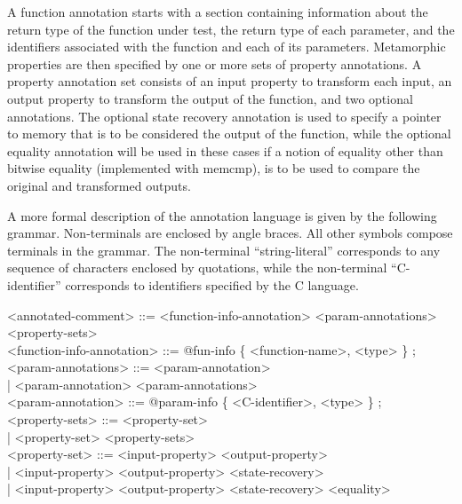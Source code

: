 \documentclass[notitlepage]{article}
\begin{document}
A function annotation starts with a section containing information about the return type of the function under test, the return type of each parameter, and the identifiers associated with the function and each of its parameters. Metamorphic properties are then specified by one or more sets of property annotations. A property annotation set consists of an input property to transform each input, an output property to transform the output of the function, and two optional annotations. The optional state recovery annotation is used to specify a pointer to memory that is to be considered the output of the function, while the optional equality annotation will be used in these cases if a notion of equality other than bitwise equality (implemented with memcmp), is to be used to compare the original and transformed outputs.

A more formal description of the annotation language is given by the following grammar. Non-terminals are enclosed by angle braces. All other symbols compose terminals in the grammar. The non-terminal ``string-literal'' corresponds to any sequence of characters enclosed by quotations, while the non-terminal ``C-identifier'' corresponds to identifiers specified by the C language.


\ttfamily

<annotated-comment> ::= <function-info-annotation> <param-annotations> <property-sets> \\

<function-info-annotation> ::= @fun-info \{ <function-name>, <type> \} ; \\

<param-annotations> ::= <param-annotation> \\
\phantom{1}\hspace{105pt}| <param-annotation> <param-annotations> \\

<param-annotation> ::= @param-info \{ <C-identifier>, <type> \} ; \\

<property-sets> ::= <property-set> \\
\phantom{1}\hspace{85pt}| <property-set> <property-sets> \\

<property-set> ::= <input-property> <output-property> \\
\phantom{1}\hspace{82pt}| <input-property> <output-property> <state-recovery> \\
\phantom{1}\hspace{82pt}| <input-property> <output-property> <state-recovery> <equality> \\
\end{document}
